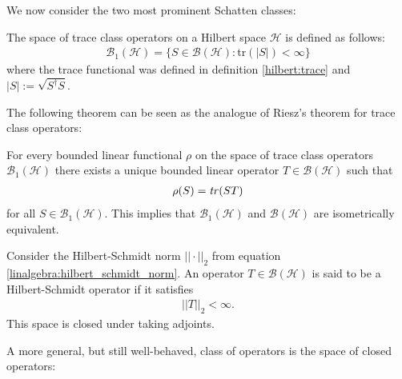     We now consider the two most prominent Schatten classes:
    \begin{example}
        The space of trace class operators on a Hilbert space $\mathcal{H}$ is defined as follows:
        \begin{gather}
            \mathcal{B}_1(\mathcal{H}) = \{S\in\mathcal{B}(\mathcal{H}):\text{tr}(|S|)<\infty\}
        \end{gather}
        where the trace functional was defined in definition \ref{hilbert:trace} and $|S|:=\sqrt{S^\dag S}$.
    \end{example}
    The following theorem can be seen as the analogue of Riesz's theorem for trace class operators:
    \begin{theorem}
        For every bounded linear functional $\rho$ on the space of trace class operators $\mathcal{B}_1(\mathcal{H})$ there exists a unique bounded linear operator $T\in\mathcal{B}(\mathcal{H})$ such that
        \begin{gather}
            \rho(S) = \text{\emph{tr}}(ST)
        \end{gather}
        for all $S\in\mathcal{B}_1(\mathcal{H})$. This implies that $\mathcal{B}_1(\mathcal{H})$ and $\mathcal{B}(\mathcal{H})$ are isometrically equivalent.
    \end{theorem}

    \begin{example}\label{hilbert:hilbert_schmidt}
        Consider the Hilbert-Schmidt norm $||\cdot||_2$ from equation \ref{linalgebra:hilbert_schmidt_norm}. An operator $T\in\mathcal{B}(\mathcal{H})$ is said to be a Hilbert-Schmidt operator if it satisfies
        \begin{gather}
            ||T||_2<\infty.
        \end{gather}
        This space is closed under taking adjoints.
    \end{example}

    A more general, but still well-behaved, class of operators is the space of closed operators:

